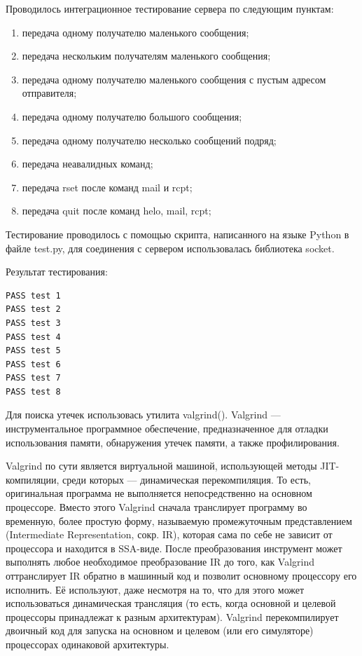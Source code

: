 \documentclass[a4paper,12pt]{report}
\begin{document}
Проводилось интеграционное тестирование сервера по следующим пунктам:
\begin{enumerate}
	\item передача одному получателю маленького сообщения;
	\item передача нескольким получателям маленького сообщения;
	\item передача одному получателю маленького сообщения с пустым адресом отправителя;
    \item передача одному получателю большого сообщения;
    \item передача одному получателю несколько сообщений подряд;
    \item передача неавалидных команд;
    \item передача rset после команд mail и rcpt;
    \item передача quit после команд helo, mail, rcpt;
\end{enumerate}

Тестирование проводилось с помощью скрипта, написанного на языке Python в файле test.py, для соединения с сервером использовалась библиотека socket.

Результат тестирования:
\begin{verbatim}
PASS test 1
PASS test 2
PASS test 3
PASS test 4
PASS test 5
PASS test 6
PASS test 7
PASS test 8
\end{verbatim}


Для поиска утечек использовась утилита valgrind(\cite{valgrind}). Valgrind — инструментальное программное обеспечение, предназначенное для отладки использования памяти, обнаружения утечек памяти, а также профилирования. 

Valgrind по сути является виртуальной машиной, использующей методы JIT-компиляции, среди которых — динамическая перекомпиляция. То есть, оригинальная программа не выполняется непосредственно на основном процессоре. Вместо этого Valgrind сначала транслирует программу во временную, более простую форму, называемую промежуточным представлением (Intermediate Representation, сокр. IR), которая сама по себе не зависит от процессора и находится в SSA-виде. После преобразования инструмент может выполнять любое необходимое преобразование IR до того, как Valgrind оттранслирует IR обратно в машинный код и позволит основному процессору его исполнить. Её используют, даже несмотря на то, что для этого может использоваться динамическая трансляция (то есть, когда основной и целевой процессоры принадлежат к разным архитектурам). Valgrind перекомпилирует двоичный код для запуска на основном и целевом (или его симуляторе) процессорах одинаковой архитектуры.
\end{document}
